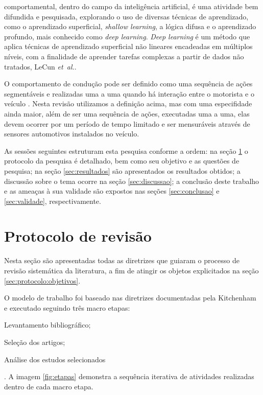 \documentclass[10pt,journal,compsoc]{IEEEtran}
\begin{document}

 comportamental, dentro do campo da inteligência artificial, é uma
atividade bem difundida e pesquisada, explorando o uso de diversas técnicas de aprendizado,
como o aprendizado superficial, \textit{shallow learning}, a lógica
difusa e o aprendizado profundo, mais conhecido como \textit{deep
  learning}. \textit{Deep learning} é um método que aplica
técnicas de aprendizado superficial não lineares encadeadas em múltiplos níveis, com a finalidade de aprender tarefas complexas a partir de dados não
tratados, LeCun \emph{et~al.}\cite{Lecun2015436}.

O comportamento de condução pode ser definido como uma sequência de
ações segmentáveis e realizadas uma a uma quando há interação entre o motorista e o
veículo \cite{Liu2016}. Nesta revisão
utilizamos a definição acima, mas com uma especifidade ainda maior,
além de ser uma sequência de ações, executadas uma a uma, elas devem
ocorrer por um período de tempo limitado e ser mensuráveis através de
sensores automotivos instalados no veículo.

As sessões seguintes estruturam esta pesquisa conforme a ordem: na seção
\ref{sec:protocolo} o protocolo da pesquisa é detalhado, bem como seu
objetivo e as questões de pesquisa; na seção \ref{sec:resultados}
são apresentados os resultados obtidos; a discussão sobre o tema
ocorre na seção \ref{sec:discussao}; a conclusão deste trabalho e as
ameaças à sua validade são expostos nas seções \ref{sec:conclusao} e
\ref{sec:validade}, respectivamente.

\section{Protocolo de revisão}
\label{sec:protocolo}
Nesta seção são apresentadas todas as diretrizes que guiaram o
processo de revisão sistemática da literatura, a fim de atingir os
objetos explicitados na seção \ref{sec:protocolo:objetivos}.

O modelo de trabalho foi baseado nas diretrizes
documentadas pela Kitchenham \cite{kitchenham2007} e executado
seguindo três macro etapas:
\begin{enumerate*}
\item Levantamento bibliográfico;
\item Seleção dos artigos;
\item Análise dos estudos selecionados
\end{enumerate*}. A imagem \ref{fig:etapas} demonstra a sequência iterativa de
atividades realizadas dentro de cada macro etapa.
\end{document}

